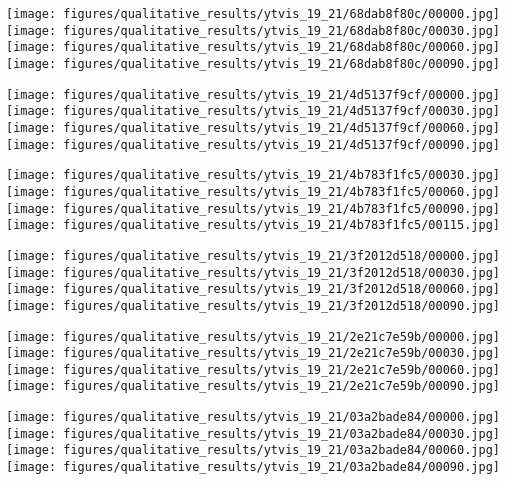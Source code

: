 \documentclass{article}
\theoremstyle{plain}
\theoremstyle{definition}
\theoremstyle{remark}
\begin{document}
\begin{figure*}[t]
    \centering
    
    \texttt{[image: figures/qualitative\_results/ytvis\_19\_21/68dab8f80c/00000.jpg]}
    \texttt{[image: figures/qualitative\_results/ytvis\_19\_21/68dab8f80c/00030.jpg]}
    \texttt{[image: figures/qualitative\_results/ytvis\_19\_21/68dab8f80c/00060.jpg]}
    \texttt{[image: figures/qualitative\_results/ytvis\_19\_21/68dab8f80c/00090.jpg]}

    \texttt{[image: figures/qualitative\_results/ytvis\_19\_21/4d5137f9cf/00000.jpg]}
    \texttt{[image: figures/qualitative\_results/ytvis\_19\_21/4d5137f9cf/00030.jpg]}
    \texttt{[image: figures/qualitative\_results/ytvis\_19\_21/4d5137f9cf/00060.jpg]}
    \texttt{[image: figures/qualitative\_results/ytvis\_19\_21/4d5137f9cf/00090.jpg]}

    \texttt{[image: figures/qualitative\_results/ytvis\_19\_21/4b783f1fc5/00030.jpg]}
    \texttt{[image: figures/qualitative\_results/ytvis\_19\_21/4b783f1fc5/00060.jpg]}
    \texttt{[image: figures/qualitative\_results/ytvis\_19\_21/4b783f1fc5/00090.jpg]}
    \texttt{[image: figures/qualitative\_results/ytvis\_19\_21/4b783f1fc5/00115.jpg]}

    \texttt{[image: figures/qualitative\_results/ytvis\_19\_21/3f2012d518/00000.jpg]}
    \texttt{[image: figures/qualitative\_results/ytvis\_19\_21/3f2012d518/00030.jpg]}
    \texttt{[image: figures/qualitative\_results/ytvis\_19\_21/3f2012d518/00060.jpg]}
    \texttt{[image: figures/qualitative\_results/ytvis\_19\_21/3f2012d518/00090.jpg]}

    




    \texttt{[image: figures/qualitative\_results/ytvis\_19\_21/2e21c7e59b/00000.jpg]}
    \texttt{[image: figures/qualitative\_results/ytvis\_19\_21/2e21c7e59b/00030.jpg]}
    \texttt{[image: figures/qualitative\_results/ytvis\_19\_21/2e21c7e59b/00060.jpg]}
    \texttt{[image: figures/qualitative\_results/ytvis\_19\_21/2e21c7e59b/00090.jpg]}

    \texttt{[image: figures/qualitative\_results/ytvis\_19\_21/03a2bade84/00000.jpg]}
    \texttt{[image: figures/qualitative\_results/ytvis\_19\_21/03a2bade84/00030.jpg]}
    \texttt{[image: figures/qualitative\_results/ytvis\_19\_21/03a2bade84/00060.jpg]}
    \texttt{[image: figures/qualitative\_results/ytvis\_19\_21/03a2bade84/00090.jpg]}


\end{figure*}
\end{document}
